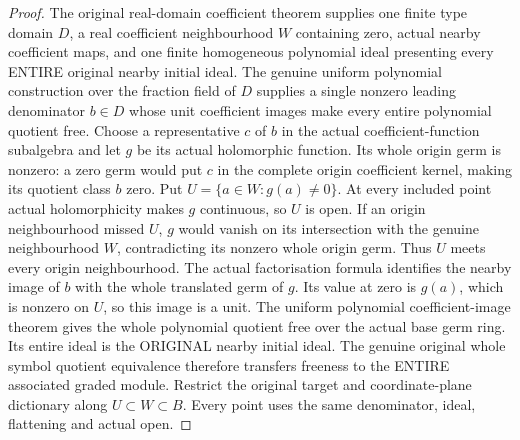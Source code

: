\begin{proof}
The original real-domain coefficient theorem supplies one finite type domain
$D$, a real coefficient neighbourhood $W$ containing zero, actual nearby
coefficient maps, and one finite homogeneous polynomial ideal presenting
every ENTIRE original nearby initial ideal. The genuine uniform polynomial
construction over the fraction field of $D$ supplies a single nonzero leading
denominator $b\in D$ whose unit coefficient images make every entire
polynomial quotient free. Choose a representative $c$ of $b$ in the actual
coefficient-function subalgebra and let $g$ be its actual holomorphic function.
Its whole origin germ is nonzero: a zero germ would put $c$ in the complete
origin coefficient kernel, making its quotient class $b$ zero.
Put $U=\{a\in W:g(a)\ne0\}$. At every included point actual holomorphicity
makes $g$ continuous, so $U$ is open. If an origin neighbourhood missed $U$,
$g$ would vanish on its intersection with the genuine neighbourhood $W$,
contradicting its nonzero whole origin germ. Thus $U$ meets every origin
neighbourhood. The actual factorisation formula identifies the nearby image
of $b$ with the whole translated germ of $g$. Its value at zero is $g(a)$,
which is nonzero on $U$, so this image is a unit. The uniform polynomial
coefficient-image theorem gives the whole polynomial quotient free over the
actual base germ ring. Its entire ideal is the ORIGINAL nearby initial ideal.
The genuine original whole symbol quotient equivalence therefore transfers
freeness to the ENTIRE associated graded module. Restrict the original target
and coordinate-plane dictionary along $U\subset W\subset B$. Every point
uses the same denominator, ideal, flattening and actual open.
\end{proof}

